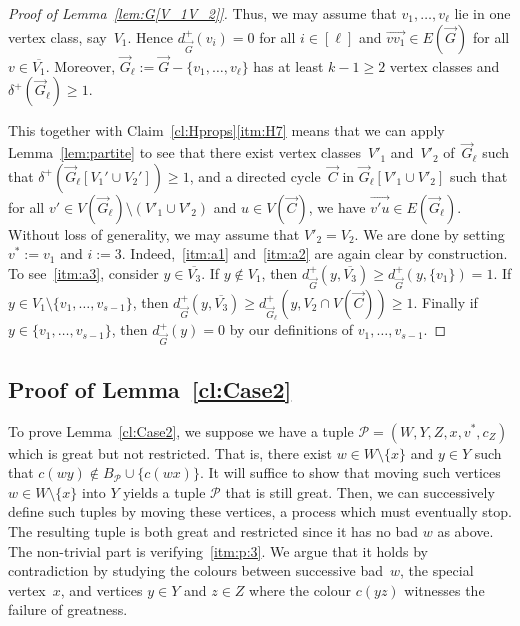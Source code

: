 \documentclass[a4paper, 12pt]{article}
\numberwithin{equation}{section}
\def\sm{{\setminus}}
\newcommand{\ova}[1]{\overrightarrow{#1}}
\newcommand{\mc}[1]{\mathcal{#1}}
\begin{document}
\begin{proof}[Proof of Lemma~\ref{lem:G[V_1V_2]}]
Thus, we may assume that $v_1, \dots, v_\ell$ lie in one vertex class, say~$V_1$. 
Hence $d^+_{\ova{G}}(v_i) = 0$ for all $i \in [\ell]$ and
$\ova{v v_1} \in E(\ova{G})$ for all $v \in \overline{V_1}$.
Moreover, $\ova{G}_\ell := \ova{G}-\{v_1,\ldots,v_{\ell}\}$ has at least $k-1 \geq 2$ vertex classes and $\delta^+(\ova{G}_{\ell}) \ge 1$. 

This together with Claim~\ref{cl:Hprops}\ref{itm:H7} means that we can apply Lemma~\ref{lem:partite} to see that there exist vertex classes~$V'_1$ and~$V'_2$ of~$\ova{G}_{\ell}$ such that $\delta^+(\ova{G}_{\ell}[V_1' \cup V_2']) \geq 1$, and a directed cycle~$\ova{C}$ in $\ova{G}_{\ell}[V'_1 \cup V'_2]$ such that for all $v' \in V(\ova{G}_{\ell}) \setminus (V'_1 \cup V'_2)$ and $u \in V(\ova{C})$, we have $\ova{v'u}\in E(\ova{G}_{\ell})$.
Without loss of generality, we may assume that $V'_2 = V_2$.
We are done by setting $v^* := v_1$ and $i := 3$.
Indeed,~\ref{itm:a1} and~\ref{itm:a2} are again clear by construction.
To see~\ref{itm:a3}, consider $y \in \overline{V_3}$.
If $y \notin V_{1}$, then $d^+_{\ova{G}}(y,  \overline{V_3} ) \ge d^+_{\ova{G}}(y,  \{v_1\} )  = 1$.
If $y \in V_{1} \sm \{v_1,\dots, v_{s-1}\}$, then $d^+_{\ova{G}}(y,  \overline{V_3} ) \ge  d^+_{\ova{G}_\ell}(y,  V_2 \cap V(\ova{C}) ) \ge 1$.
Finally if $y \in \{v_1,\dots, v_{s-1}\}$, then $d^+_{\ova{G}}(y) = 0$ by our definitions of $v_1,\dots, v_{s-1}$. 
\end{proof}



\subsection{Proof of Lemma~\ref{cl:Case2}}

To prove Lemma~\ref{cl:Case2}, we suppose we have a tuple $\mc{P}=(W,Y,Z,x,v^*,c_Z)$ which is great but not restricted.
That is, there exist $w \in W \setminus \{x\}$ and $y \in Y$ such that $c(wy) \notin B_{\mc{P}} \cup \{c(wx)\}$.
It will suffice to show that moving such vertices $w \in W \setminus \{x\}$ into $Y$ yields a tuple $\mc{P}$ that is still great. Then, we can successively define such tuples by moving these vertices, a process which must eventually stop. The resulting tuple is both great and restricted since it has no bad $w$ as above.
The non-trivial part is verifying~\ref{itm:p:3}. We argue that it holds by contradiction by studying the colours between successive bad~$w$, the special vertex~$x$, and vertices $y \in Y$ and $z \in Z$ where the colour $c(yz)$ witnesses the failure of greatness.
\end{document}
